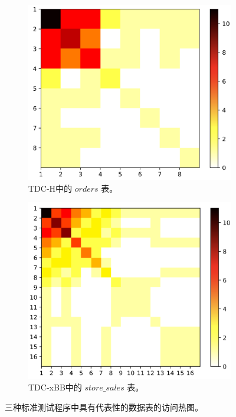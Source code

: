 \begin{figure}[]
    \begin{subfigure}[t]{0.5\textwidth}
        \centering
        \includegraphics[width=1\textwidth]{img/motivation/tpc-h-orders}
        \caption{TDC-H中的 $orders$ 表。}
        \label{fig:h_count_cdf}
    \end{subfigure}%

    \begin{subfigure}[t]{0.5\textwidth}
        \centering
        \includegraphics[width=1\textwidth]{img/motivation/tpc-bb-store_sales}
        \caption{TDC-xBB中的 $store\_sales$ 表。}
        \label{fig:bb_count_cdf}
    \end{subfigure}%
    \caption{三种标准测试程序中具有代表性的数据表的访问热图。}
    \label{fig:heatmap}
\end{figure}

